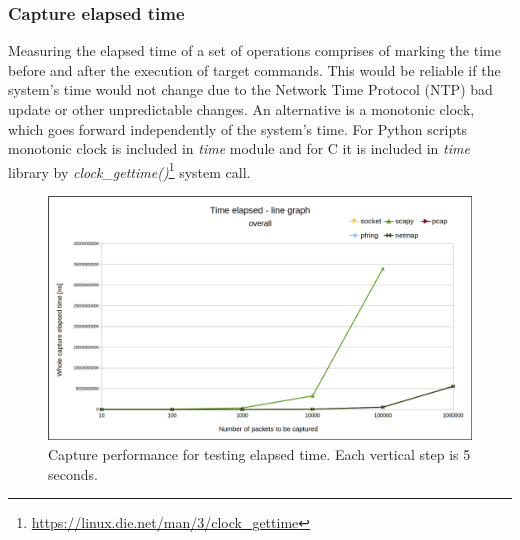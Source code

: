 \documentclass[12pt,a4paper,twoside]{book}
\begin{document}
            \subsubsection*{Capture elapsed time} \label{analysis:testing:results:timed}
                Measuring the elapsed time of a set of operations comprises of marking the time before and after the execution of target commands. This would be reliable if the system's time would not change due to the Network Time Protocol (NTP) bad update or other unpredictable changes. An alternative is a monotonic clock, which goes forward independently of the system's time. For Python scripts monotonic clock is included in \emph{time} module and for C it is included in \emph{time} library by \emph{clock\_gettime()}\footnote{\url{https://linux.die.net/man/3/clock_gettime}} system call.\par
                \begin{figure}[h]
                    \centering
                    \includegraphics[scale=0.39]{overall_speed_line-graph}
                    \caption{Capture performance for testing elapsed time. Each vertical step is 5 seconds.}
                    \label{figure:tests:alltimed}
                \end{figure}
\end{document}
